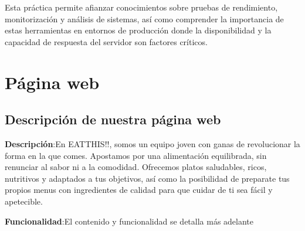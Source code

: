 \documentclass[10pt]{book}
\begin{document}
Esta práctica permite afianzar conocimientos sobre pruebas de rendimiento, monitorización y análisis de sistemas, así como comprender la importancia de estas herramientas en entornos de producción donde la disponibilidad y la capacidad de respuesta del servidor son factores críticos.\\


\chapter{Página web}
\section{Descripción de nuestra página web}
\textbf{Descripción}:En EATTHIS!!, somos un equipo joven con ganas de revolucionar la forma en la que comes. Apostamos por una alimentación equilibrada, sin renunciar al sabor ni a la comodidad. Ofrecemos platos saludables, ricos, nutritivos y adaptados a tus objetivos, así como la posibilidad de preparate tus propios menus con ingredientes de calidad para que cuidar de ti sea fácil y apetecible.

\textbf{Funcionalidad}:El contenido y funcionalidad se detalla
más adelante
\end{document}
